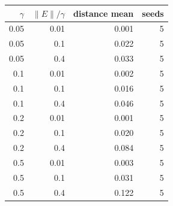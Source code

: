 \begin{tabular}{rrrr}
\toprule
$\gamma$ & $\lVert E\rVert/\gamma$ & distance mean & seeds \\
\midrule
0.05 & 0.01 & 0.001 & 5 \\
0.05 & 0.1 & 0.022 & 5 \\
0.05 & 0.4 & 0.033 & 5 \\
0.1 & 0.01 & 0.002 & 5 \\
0.1 & 0.1 & 0.016 & 5 \\
0.1 & 0.4 & 0.046 & 5 \\
0.2 & 0.01 & 0.001 & 5 \\
0.2 & 0.1 & 0.020 & 5 \\
0.2 & 0.4 & 0.084 & 5 \\
0.5 & 0.01 & 0.003 & 5 \\
0.5 & 0.1 & 0.031 & 5 \\
0.5 & 0.4 & 0.122 & 5 \\
\bottomrule
\end{tabular}
